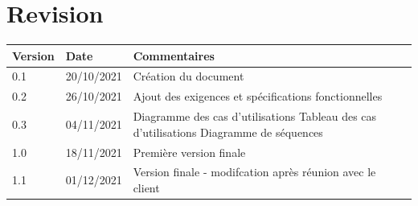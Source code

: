\documentclass[a4paper, twoside, 12pt]{report}
\title{\titleOfDoc}
\author{\authors}
\begin{document}


\chapter*{Revision}
\begin{table}[!ht] %
	\begin{tabular}{ | m{3cm} | m{3cm}| m{8cm} | } 
		\hline
		\textbf{Version} & \textbf{Date} & \textbf{Commentaires} \\
		\hline
			0.1 & 20/10/2021 & Création du document\\
		\hline
			0.2 & 26/10/2021 & Ajout des exigences et spécifications fonctionnelles \\
		\hline
			0.3 & 04/11/2021 & Diagramme des cas d'utilisations\newline
			    Tableau des cas d'utilisations\newline
			    Diagramme de séquences \\
		\hline
			1.0 & 18/11/2021 & Première version finale \\
		\hline
			1.1 & 01/12/2021 & Version finale - modifcation après réunion avec le client\\
		\hline
	\end{tabular}
\end{table}

\tableofcontents
\newpage



%
%
\end{document}
